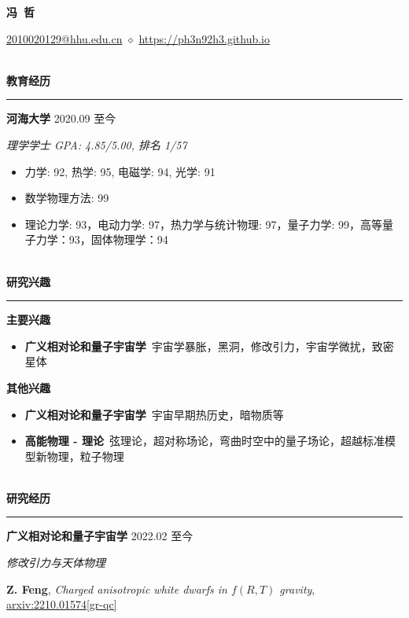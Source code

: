\documentclass[12pt]{article}
\newcommand{\sect}[1]{
    ~\\ \noindent \textbf{#1} \medskip \hrule \medskip
}
\begin{document}
\pagestyle{empty}


\begin{center}
    \LARGE{\textbf{冯\ 哲}}
\end{center}

\begin{center}
    \href{mailto:2010020129@hhu.edu.cn}{2010020129@hhu.edu.cn} $\diamond$ \href{https://ph3n92h3.github.io}{https://ph3n92h3.github.io}
\end{center}


\sect{教育经历}

\textbf{河海大学} \hfill 2020.09 至今

\textit{理学学士 \hfill GPA: 4.85/5.00, 排名 1/57}

\begin{itemize}[noitemsep,nolistsep]
    \item 力学: 92, 热学: 95, 电磁学: 94, 光学: 91
    \item 数学物理方法: 99
    \item 理论力学: 93，电动力学: 97，热力学与统计物理: 97，量子力学: 99，高等量子力学：93，固体物理学：94
\end{itemize}


\sect{研究兴趣}

\textbf{主要兴趣}
\begin{itemize}[noitemsep,nolistsep]
    \item \textbf{广义相对论和量子宇宙学}\ 宇宙学暴胀，黑洞，修改引力，宇宙学微扰，致密星体
\end{itemize}

\textbf{其他兴趣}
\begin{itemize}[noitemsep,nolistsep]
    \item \textbf{广义相对论和量子宇宙学}\ 宇宙早期热历史，暗物质等
    \item \textbf{高能物理 - 理论}\ 弦理论，超对称场论，弯曲时空中的量子场论，超越标准模型新物理，粒子物理
\end{itemize}


\sect{研究经历}

\textbf{广义相对论和量子宇宙学} \hfill 2022.02 至今

\smallskip \quad \textit{修改引力与天体物理}

\textbf{Z. Feng}, \textit{Charged anisotropic white dwarfs in $f\left({R}, {T}\right)$ gravity}, \href{https://arxiv.org/abs/2210.01574}{arxiv:2210.01574[gr-qc]}
\end{document}
